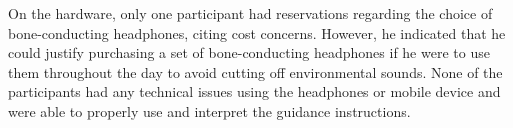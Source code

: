 \documentclass[sigconf, screen=true, anonymous=true]{acmart}
\begin{document}
On the hardware, only one participant had reservations regarding the choice of bone-conducting headphones, citing cost concerns. 
However, he indicated that he could justify purchasing a set of bone-conducting headphones if he were to use them throughout the day to avoid cutting off environmental sounds.
None of the participants had any technical issues using the headphones or mobile device and were able to properly use and interpret the guidance instructions.






\end{document}
